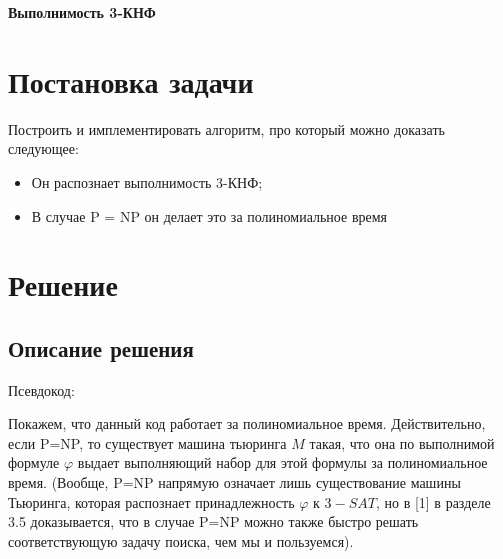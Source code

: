 \documentclass{amsart}
\theoremstyle{definition}
\theoremstyle{remark}
\numberwithin{equation}{section}
\begin{document}
\title{}

\author{Каргальцев Степан}
\address{МФТИ, 494}

\date{Декабрь 2016}

\begin{center}
\textbf{Выполнимость 3-КНФ}
\end{center}

\maketitle




\section{Постановка задачи}
Построить и имплементировать алгоритм, про который можно доказать следующее:
\begin{itemize}
\item Он распознает выполнимость 3-КНФ;
\item В случае P = NP он делает это за полиномиальное время
\end{itemize}

\section{Решение}


\subsection{Описание решения}
\bigskip

Псевдокод:\\


\begin{algorithm}[H]
		\SetAlgoLined
	}
\end{algorithm}


Покажем, что данный код работает за полиномиальное время. Действительно,
если P=NP, то существует машина тьюринга $M$ такая, что она по выполнимой
формуле $\varphi$ выдает выполняющий набор для этой формулы за полиномиальное
время. (Вообще, P=NP напрямую означает лишь существование машины Тьюринга,
которая распознает принадлежность $\varphi$ к $3-SAT$, но в [1] в разделе 3.5
доказывается, что
в случае P=NP можно также быстро решать соответствующую задачу поиска, чем мы и
пользуемся).\\
\end{document}
